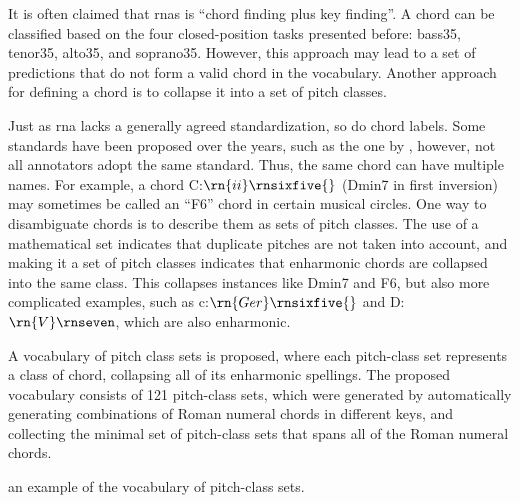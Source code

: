 
It is often claimed that \glspl{rna} is ``chord finding plus
key finding''. A chord can be classified based on the four
\gls{closed-position} tasks presented before: \gls{bass35},
\gls{tenor35}, \gls{alto35}, and \gls{soprano35}. However,
this approach may lead to a set of predictions that do not
form a valid chord in the vocabulary. Another approach for
defining a chord is to collapse it into a set of pitch
classes.

Just as \gls{rna} lacks a generally agreed standardization,
so do chord labels. Some standards have been proposed over
the years, such as the one by \textcite{harte2005automatic},
however, not all annotators adopt the same standard. Thus,
the same chord can have multiple names. For example, a chord
C:$\rn{ii}\rnsixfive{}$ (Dmin7 in first inversion) may
sometimes be called an ``F6'' chord in certain musical
circles. One way to disambiguate chords is to describe them
as sets of pitch classes. The use of a mathematical set
indicates that duplicate pitches are not taken into account,
and making it a set of pitch classes indicates that
enharmonic chords are collapsed into the same class. This
collapses instances like Dmin7 and F6, but also more
complicated examples, such as c:$\rn{Ger}\rnsixfive{}$ and
D\musFlat{}:$\rn{V}\rnseven$, which are also enharmonic.

A vocabulary of pitch class sets is proposed, where each
pitch-class set represents a class of chord, collapsing all
of its enharmonic spellings. The proposed vocabulary
consists of 121 pitch-class sets, which were generated by
automatically generating combinations of Roman numeral
chords in different keys, and collecting the minimal set of
pitch-class sets that spans all of the Roman numeral chords.

 an example of the vocabulary of
pitch-class sets.

